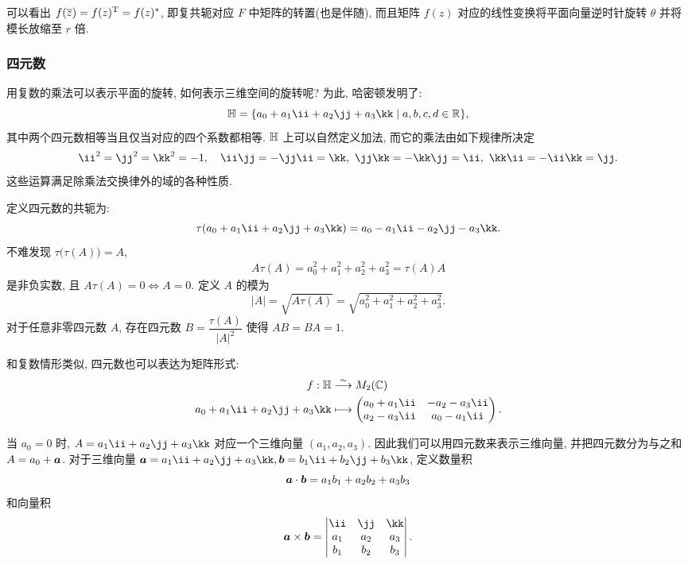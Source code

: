 可以看出 $f(\overline z)=f(z)^{\mathrm{T}}=f(z)^*$, 即复共轭对应 $F$ 中矩阵的转置(也是伴随), 而且矩阵 $f(z)$ 对应的线性变换将平面向量逆时针旋转 $\theta$ 并将模长放缩至 $r$ 倍.


\subsubsection{四元数}
\label{sssec:quaternion-number}

用复数的乘法可以表示平面的旋转, 如何表示三维空间的旋转呢?
为此, 哈密顿发明了:
\[
  \BH=\{a_0+a_1\ii+a_2\jj+a_3\kk\mid a,b,c,d\in\BR\},
\]
其中两个四元数相等当且仅当对应的四个系数都相等.
${\mathbb{H}}$ 上可以自然定义加法, 而它的乘法由如下规律所决定
\[
  \ii^2=\jj^2=\kk^2=-1,\quad 
  \ii\jj=-\jj\ii=\kk,\ 
  \jj\kk=-\kk\jj=\ii,\ 
  \kk\ii=-\ii\kk=\jj.
\]
这些运算满足除乘法交换律外的域的各种性质.

定义四元数的共轭为:
\[
  \tau(a_0+a_1\ii+a_2\jj+a_3\kk)
  =a_0-a_1\ii-a_2\jj-a_3\kk.
\]
不难发现 $\tau\bigl(\tau(A)\bigr)=A$,
\begin{align*}
   A\tau(A)
  =a_0^2+a_1^2+a_2^2+a_3^2
  =\tau(A)A
\end{align*}
是非负实数, 且 $A\tau(A)=0\iff A=0$. 
定义 $A$ 的模为
\[
  |A|=\sqrt{A\tau(A)}=\sqrt{a_0^2+a_1^2+a_2^2+a_3^2}.
\]
对于任意非零四元数 $A$, 存在四元数 $B=\dfrac{\tau(A)}{|A|^2}$ 使得 $AB=BA=1$. 

和复数情形类似, 四元数也可以表达为矩阵形式:
\begin{equation}
  \label{eq:quaternion-matrix}
  \begin{aligned}
    f:\BH&\simto M_2(\BC)\\
    a_0+a_1\ii+a_2\jj+a_3\kk&\lto \begin{pmatrix}
      a_0+a_1\ii&-a_2-a_3\ii\\
      a_2-a_3\ii&a_0-a_1\ii
    \end{pmatrix}.
  \end{aligned}
\end{equation}

当 $a_0=0$ 时, $A=a_1\ii+a_2\jj+a_3\kk$ 对应一个三维向量 $(a_1,a_2,a_3)$.
因此我们可以用四元数来表示三维向量, 并把四元数分为与之和 $A=a_0+{\boldsymbol{a}}$.
对于三维向量 $\bfa=a_1\ii+a_2\jj+a_3\kk, \bfb=b_1\ii+b_2\jj+b_3\kk$, 定义数量积
\[
  {\boldsymbol{a}}\cdot{\boldsymbol{b}}=a_1b_1+a_2b_2+a_3b_3
\]
和向量积
\[
  \bfa\times\bfb=\begin{vmatrix}
    \ii&\jj&\kk\\
    a_1&a_2&a_3\\
    b_1&b_2&b_3
  \end{vmatrix}.
\]


